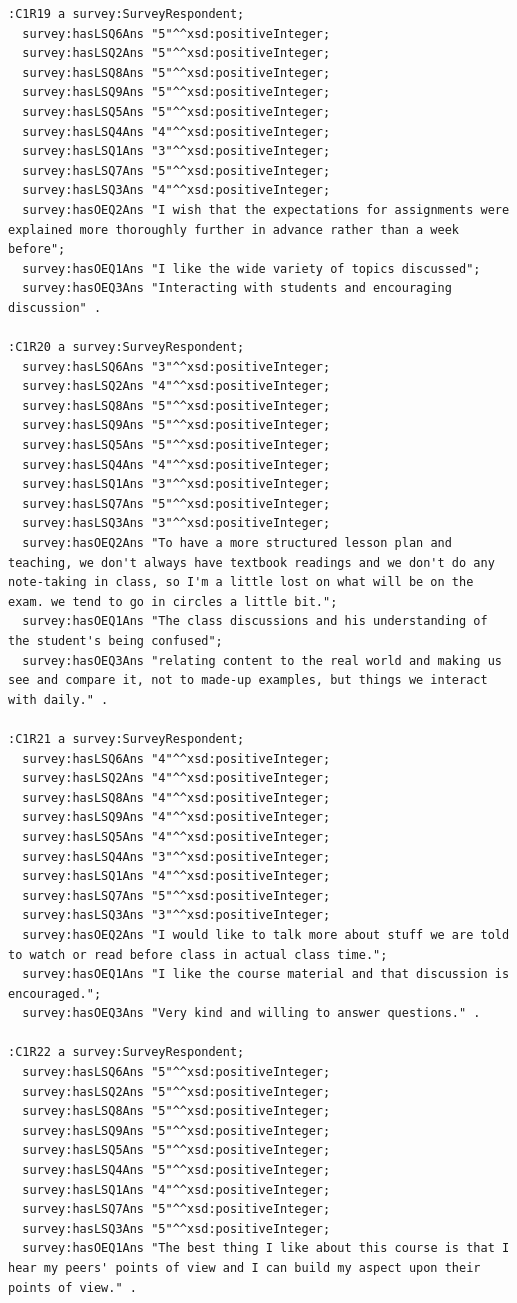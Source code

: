 \begin{lstlisting}
:C1R19 a survey:SurveyRespondent;
  survey:hasLSQ6Ans "5"^^xsd:positiveInteger;
  survey:hasLSQ2Ans "5"^^xsd:positiveInteger;
  survey:hasLSQ8Ans "5"^^xsd:positiveInteger;
  survey:hasLSQ9Ans "5"^^xsd:positiveInteger;
  survey:hasLSQ5Ans "5"^^xsd:positiveInteger;
  survey:hasLSQ4Ans "4"^^xsd:positiveInteger;
  survey:hasLSQ1Ans "3"^^xsd:positiveInteger;
  survey:hasLSQ7Ans "5"^^xsd:positiveInteger;
  survey:hasLSQ3Ans "4"^^xsd:positiveInteger;
  survey:hasOEQ2Ans "I wish that the expectations for assignments were explained more thoroughly further in advance rather than a week before";
  survey:hasOEQ1Ans "I like the wide variety of topics discussed";
  survey:hasOEQ3Ans "Interacting with students and encouraging discussion" .

:C1R20 a survey:SurveyRespondent;
  survey:hasLSQ6Ans "3"^^xsd:positiveInteger;
  survey:hasLSQ2Ans "4"^^xsd:positiveInteger;
  survey:hasLSQ8Ans "5"^^xsd:positiveInteger;
  survey:hasLSQ9Ans "5"^^xsd:positiveInteger;
  survey:hasLSQ5Ans "5"^^xsd:positiveInteger;
  survey:hasLSQ4Ans "4"^^xsd:positiveInteger;
  survey:hasLSQ1Ans "3"^^xsd:positiveInteger;
  survey:hasLSQ7Ans "5"^^xsd:positiveInteger;
  survey:hasLSQ3Ans "3"^^xsd:positiveInteger;
  survey:hasOEQ2Ans "To have a more structured lesson plan and teaching, we don't always have textbook readings and we don't do any note-taking in class, so I'm a little lost on what will be on the exam. we tend to go in circles a little bit.";
  survey:hasOEQ1Ans "The class discussions and his understanding of the student's being confused";
  survey:hasOEQ3Ans "relating content to the real world and making us see and compare it, not to made-up examples, but things we interact with daily." .

:C1R21 a survey:SurveyRespondent;
  survey:hasLSQ6Ans "4"^^xsd:positiveInteger;
  survey:hasLSQ2Ans "4"^^xsd:positiveInteger;
  survey:hasLSQ8Ans "4"^^xsd:positiveInteger;
  survey:hasLSQ9Ans "4"^^xsd:positiveInteger;
  survey:hasLSQ5Ans "4"^^xsd:positiveInteger;
  survey:hasLSQ4Ans "3"^^xsd:positiveInteger;
  survey:hasLSQ1Ans "4"^^xsd:positiveInteger;
  survey:hasLSQ7Ans "5"^^xsd:positiveInteger;
  survey:hasLSQ3Ans "3"^^xsd:positiveInteger;
  survey:hasOEQ2Ans "I would like to talk more about stuff we are told to watch or read before class in actual class time.";
  survey:hasOEQ1Ans "I like the course material and that discussion is encouraged.";
  survey:hasOEQ3Ans "Very kind and willing to answer questions." .

:C1R22 a survey:SurveyRespondent;
  survey:hasLSQ6Ans "5"^^xsd:positiveInteger;
  survey:hasLSQ2Ans "5"^^xsd:positiveInteger;
  survey:hasLSQ8Ans "5"^^xsd:positiveInteger;
  survey:hasLSQ9Ans "5"^^xsd:positiveInteger;
  survey:hasLSQ5Ans "5"^^xsd:positiveInteger;
  survey:hasLSQ4Ans "5"^^xsd:positiveInteger;
  survey:hasLSQ1Ans "4"^^xsd:positiveInteger;
  survey:hasLSQ7Ans "5"^^xsd:positiveInteger;
  survey:hasLSQ3Ans "5"^^xsd:positiveInteger;
  survey:hasOEQ1Ans "The best thing I like about this course is that I hear my peers' points of view and I can build my aspect upon their points of view." .


\end{lstlisting}
